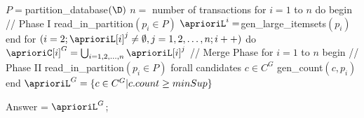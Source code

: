 $P = $partition_database$(\D)$
$n = $ number of transactions
for $i = 1$ to $n$ do begin // Phase I
	read_in_partition$(p_i\in P)$
	$\aprioriL^i=$gen_large_itemsets$(p_i)$
end
for $(i = 2; \aprioriL[i]^j \neq \emptyset, j = 1,2,\ldots,n; i++)$ do
	$\aprioriC[i]^G = \bigcup_{i=1,2,\ldots,n}{\aprioriL[i]^j}$ // Merge Phase
for $i=1$ to $n$ begin // Phase II
	read_in_partition$(p_i\in P)$
	forall candidates $c\in C^G$ gen_count$(c, p_i)$
end
$\aprioriL^G = \{c\in C^G | c.count\geq minSup\}$

Answer = $\aprioriL^G$;
